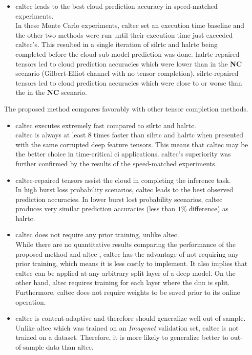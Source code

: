 \begin{itemize}
	\item \gls{caltec} leads to the best cloud prediction accuracy in speed-matched experiments. \\
	In these Monte Carlo experiments, \gls{caltec} set an execution time baseline and the other two methods were run until their execution time just exceeded \gls{caltec}'s. This resulted in a single iteration of \gls{silrtc} and \gls{halrtc} being completed before the cloud sub-model prediction was done. \gls{halrtc}-repaired tensors led to cloud prediction accuracies which were lower than in the \textbf{NC} scenario (Gilbert-Elliot channel with no tensor completion). \gls{silrtc}-repaired tensors led to cloud prediction accuracies which were close to or worse than the in the \textbf{NC} scenario.
\end{itemize}

The proposed method compares favorably with other tensor completion methods.
\begin{itemize}
	\item \gls{caltec} executes extremely fast compared to \gls{silrtc} and \gls{halrtc}. \\
	\gls{caltec} is always at least 8 times faster than \gls{silrtc} and \gls{halrtc} when presented with the same corrupted deep feature tensors. This means that \gls{caltec} may be the better choice in time-critical \gls{ci} applications. \gls{caltec}'s superiority was further confirmed by the results of the speed-matched experiments.
	\item \gls{caltec}-repaired tensors assist the cloud in completing the inference task. \\ 
	In high burst loss probability scenarios, \gls{caltec} leads to the best observed prediction accuracies. In lower burst lost probability scenarios, \gls{caltec} produces very similar prediction accuracies (less than $1\%$ difference) as \gls{halrtc}.
	\item \gls{caltec} does not require any prior training, unlike \gls{altec}. \\
	While there are no quantitative results comparing the performance of the proposed method and \gls{altec} \cite{9017944}, \gls{caltec} has the advantage of not requiring any prior training, which means it is less costly to implement. It also implies that \gls{caltec} can be applied at any arbitrary split layer of a deep model. On the other hand, \gls{altec} requires training for each layer where the \gls{dnn} is split. Furthermore, \gls{caltec} does not require weights to be saved prior to its online operation.
	\item \gls{caltec} is content-adaptive and therefore should generalize well out of sample. \\ Unlike \gls{altec} which was trained on an \textit{Imagenet} validation set, \gls{caltec} is not trained on a dataset. Therefore, it is more likely to generalize better to out-of-sample data than \gls{altec}.
\end{itemize}

